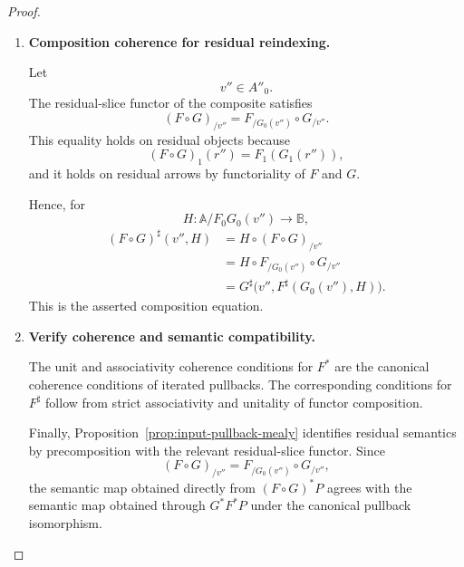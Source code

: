 \begin{proof}
\begin{enumerate}
        \item \textbf{Composition coherence for residual reindexing.}

        Let
        \[
            v''\in A''_0.
        \]
        The residual-slice functor of the composite satisfies
        \[
            (F\circ G)_{/v''}
            =
            F_{/G_0(v'')}
            \circ
            G_{/v''}.
        \]
        This equality holds on residual objects because
        \[
            (F\circ G)_1(r'')
            =
            F_1(G_1(r'')),
        \]
        and it holds on residual arrows by functoriality of \(F\) and \(G\).

        Hence, for
        \[
            H:
            \mathbb A/F_0G_0(v'')
            \to
            \mathbb B,
        \]
        \[
        \begin{aligned}
            (F\circ G)^\sharp(v'',H)
            &=
            H\circ(F\circ G)_{/v''}
            \\
            &=
            H\circ F_{/G_0(v'')}
            \circ G_{/v''}
            \\
            &=
            G^\sharp
            \bigl(
                v'',
                F^\sharp(G_0(v''),H)
            \bigr).
        \end{aligned}
        \]
        This is the asserted composition equation.

        \item \textbf{Verify coherence and semantic compatibility.}

        The unit and associativity coherence conditions for \(F^*\) are the
        canonical coherence conditions of iterated pullbacks. The
        corresponding conditions for \(F^\sharp\) follow from strict
        associativity and unitality of functor composition.

        Finally, Proposition~\ref{prop:input-pullback-mealy} identifies
        residual semantics by precomposition with the relevant residual-slice
        functor. Since
        \[
            (F\circ G)_{/v''}
            =
            F_{/G_0(v'')}
            \circ
            G_{/v''},
        \]
        the semantic map obtained directly from \((F\circ G)^*P\) agrees with
        the semantic map obtained through \(G^*F^*P\) under the canonical
        pullback isomorphism.
    \end{enumerate}
\end{proof}

